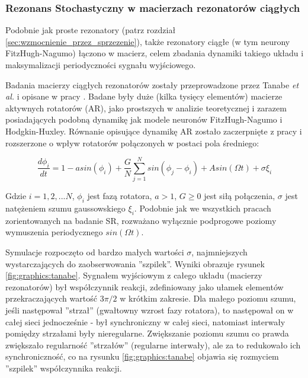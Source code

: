 


  \subsubsection{Rezonans Stochastyczny w macierzach rezonatorów ciągłych}

  Podobnie jak proste rezonatory (patrz rozdział \ref{sec:wzmocnienie_przez_sprzezenie}), także rezonatory ciągłe (w tym neurony FitzHugh-Nagumo) łączono w macierz, celem zbadania dynamiki takiego układu i maksymalizacji periodyczności sygnału wyjściowego. 

  Badania macierzy ciągłych rezonatorów zostały przeprowadzone przez Tanabe \emph{et al.} i opisane w pracy \cite{tanabe_shimokawa}. Badane były duże (kilka tysięcy elementów) macierze aktywnych rotatorów (AR), jako prostszych w analizie teoretycznej i zarazem posiadających podobną dynamikę jak modele neuronów FitzHugh-Nagumo i Hodgkin-Huxley. Równanie opisujące dynamikę AR zostało zaczerpnięte z pracy \cite{shinomoto} i rozszerzone o wpływ rotatorów połączonych w postaci pola średniego:

  \begin{equation}
    \frac{d \phi_i}{dt} = 1 - a sin(\phi_i) + \frac{G}{N} \sum\limits_{j=1}^{N} sin(\phi_j - \phi_i) + A sin(\Omega t) + \sigma \xi_i
  \end{equation}

  Gdzie $i=1,2,...N$, $\phi_i$ jest fazą rotatora, $a > 1$, $G \ge 0$ jest siłą połączenia, $\sigma$ jest natężeniem szumu gaussowskiego $\xi_i$. Podobnie jak we wszystkich pracach zorientowanych na badanie SR, rozważano wyłącznie podprogowe poziomy wymuszenia periodycznego $sin(\Omega t)$.

  Symulacje rozpoczęto od bardzo małych wartości $\sigma$, najmniejszych wystarczających do zaobserwowania ''szpilek''. Wyniki obrazuje rysunek \ref{fig:graphics:tanabe}. Sygnałem wyjściowym z całego układu (macierzy rezonatorów) był współczynnik reakcji, zdefiniowany jako ułamek elementów przekraczających wartość $3 \pi / 2$ w krótkim zakresie. Dla małego poziomu szumu, jeśli następował ''strzał'' (gwałtowny wzrost fazy rotatora), to następował on w całej sieci jednocześnie - był synchroniczny w całej sieci, natomiast interwały pomiędzy strzałami były nieregularne. Zwiększanie poziomu szumu co prawda zwiększało regularność ''strzałów'' (regularne interwały), ale za to redukowało ich synchroniczność, co na rysunku \ref{fig:graphics:tanabe} objawia się rozmyciem ''szpilek'' współczynnika reakcji.

